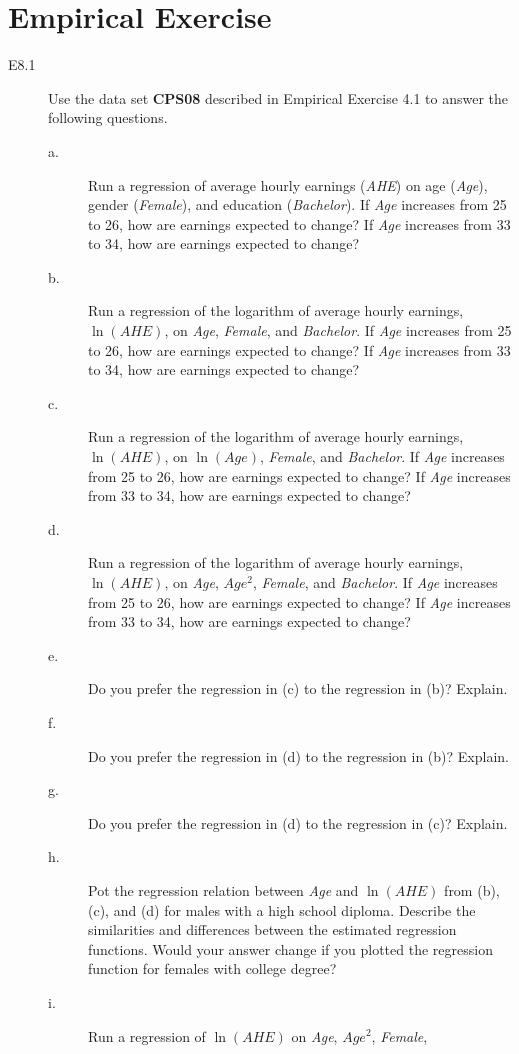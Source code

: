 \documentclass[a4paper,11pt]{article}
\begin{document}
\section*{Empirical Exercise}
\label{sec:orgccff25b}
\begin{description}
\item[{E8.1}] Use the data set \textbf{CPS08} described in Empirical Exercise 4.1
to answer the following questions.
\begin{description}
\item[{a.}] Run a regression of average hourly earnings (\emph{AHE}) on age
(\emph{Age}), gender (\emph{Female}), and education (\emph{Bachelor}). If
\emph{Age} increases from 25 to 26, how are earnings expected to
change? If \emph{Age} increases from 33 to 34, how are earnings
expected to change?
\item[{b.}] Run a regression of the logarithm of average hourly
earnings, \(\ln(AHE)\), on \emph{Age}, \emph{Female}, and \emph{Bachelor}. If
\emph{Age} increases from 25 to 26, how are earnings expected to
change? If \emph{Age} increases from 33 to 34, how are earnings
expected to change?
\item[{c.}] Run a regression of the logarithm of average hourly
earnings, \(\ln(AHE)\), on \(\ln(Age)\), \emph{Female}, and
\emph{Bachelor}. If \emph{Age} increases from 25 to 26, how are
earnings expected to change? If \emph{Age} increases from 33 to
34, how are earnings expected to change?
\item[{d.}] Run a regression of the logarithm of average hourly
earnings, \(\ln(AHE)\), on \emph{Age}, \(Age^2\), \emph{Female}, and
\emph{Bachelor}. If \emph{Age} increases from 25 to 26, how are
earnings expected to change? If \emph{Age} increases from 33 to
34, how are earnings expected to change?
\item[{e.}] Do you prefer the regression in (c) to the regression in
(b)? Explain.
\item[{f.}] Do you prefer the regression in (d) to the regression in
(b)? Explain.
\item[{g.}] Do you prefer the regression in (d) to the regression in
(c)? Explain.
\item[{h.}] Pot the regression relation between \emph{Age} and \(\ln(AHE)\)
from (b), (c), and (d) for males with a high school
diploma. Describe the similarities and differences between
the estimated regression functions. Would your answer change
if you plotted the regression function for females with
college degree?
\item[{i.}] Run a regression of \(\ln(AHE)\) on \emph{Age}, \(Age^2\), \emph{Female},

\end{description}
\end{description}
\end{document}
